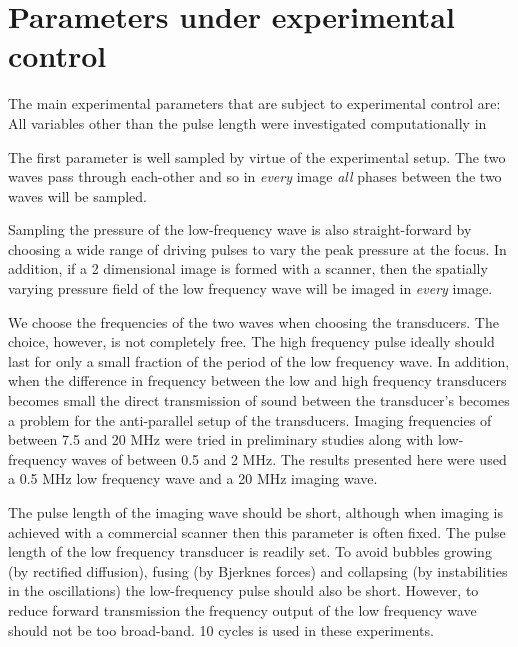 \section{Parameters under experimental control}

 The main experimental parameters that are 
 subject to experimental control are:
 All variables other than the pulse length were investigated computationally in  


 The first parameter is well sampled by  virtue of the experimental
 setup.
 The two waves pass through each-other and so in {\em every} image {\em
   all}
 phases between the two waves will be sampled.

 Sampling the pressure of the low-frequency wave is also
 straight-forward by choosing a wide range of driving pulses to vary the peak pressure
 at the focus.
 In addition, if a 2 dimensional  image is formed with a scanner,
then the spatially varying pressure field of the low frequency wave 
 will be imaged in  {\em every } image.


We choose the frequencies of the two waves when choosing the transducers.
 The choice, however, is not completely free.
 The high frequency pulse ideally should last for only a small fraction
 of the period of the low frequency wave.
 In addition, 
 when the difference in frequency between the low and high frequency transducers
 becomes small the direct transmission of sound between the transducer's
 becomes a problem for the anti-parallel setup of the transducers.
 Imaging frequencies of between 7.5 and 20 MHz were tried in preliminary studies
 along with low-frequency waves of between 0.5 and 2 MHz.
 The results presented here were used a 0.5 MHz low frequency wave and
 a 20 MHz imaging wave. %

 The pulse length of the imaging wave should be short, 
 although when imaging is achieved with a commercial scanner %
 then this parameter is often fixed.
 The pulse length of the low frequency transducer is readily set.
 To avoid bubbles growing (by rectified diffusion), fusing (by Bjerknes
 forces) and collapsing (by instabilities in the oscillations) the low-frequency
 pulse should also be short.
 However, to reduce forward transmission the  frequency output of the
 low frequency wave should not be 
 too broad-band.
 10 cycles is used in these experiments.



